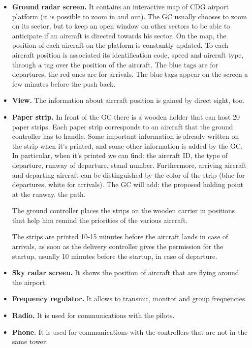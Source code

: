 \documentclass{article}
\begin{document}
\begin{itemize}
	\item \textbf{Ground radar screen.} It contains an interactive map of CDG airport platform (it is possible to zoom in and out). The GC usually chooses to zoom on its sector, but to keep an open window on other sectors to be able to anticipate if an aircraft is directed towards his sector.	
	On the map, the position of each aircraft on the platform is constantly updated. To each aircraft position is associated its identification code, speed and aircraft type, through a tag over the position of the aircraft.
	The blue tags are for departures, the red ones are for arrivals. The blue tags appear on the screen a few minutes before the push back.
	\item \textbf{View.} The information about aircraft position is gained by direct sight, too.
	\item \textbf{Paper strip.} In front of the GC there is a wooden holder that can host 20 paper strips. Each paper strip corresponds to an aircraft that the ground controller has to handle. Some important information is already written on the strip when it's printed, and some other information is added by the GC.
	In particular, when it's printed we can find: the aircraft ID, the type of departure, runway of departure, stand number. Furthermore, arriving aircraft and departing aircraft can be distinguished by the color of the strip (blue for departures, white for arrivals). 
	The GC will add: the proposed holding point at the runway, the path.
	
	The ground controller places the strips on the wooden carrier in positions that help him remind the priorities of the various aircraft.
	
	The strips are printed 10-15 minutes before the aircraft lands in case of arrivals, as soon as the delivery controller gives the permission for the startup, usually 10 minutes before the startup, in case of departure.
	
	\item\textbf{Sky radar screen.} It shows the position of aircraft that are flying around the airport.
	\item\textbf{Frequency regulator.} It allows to transmit, monitor and group frequencies.
	\item\textbf{Radio.} It is used for communications with the pilots.
	\item \textbf{Phone.} It is used for communications with the controllers that are not in the same tower.
	
	
\end{itemize}
\end{document}
